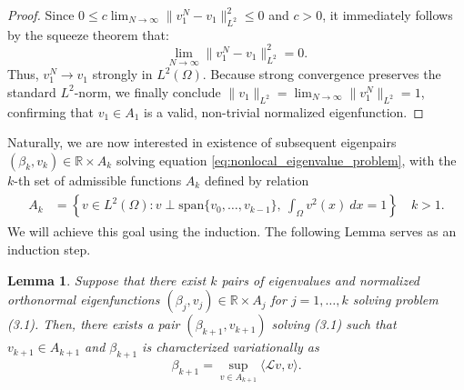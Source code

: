 \documentclass[11pt, a4paper]{article}
\theoremstyle{break}
\theoremstyle{break}
\theoremstyle{break}
\theoremstyle{break}
\theoremstyle{break}
\newtheorem{lem}{Lemma}[section]
\theoremstyle{break}
\theoremstyle{break}
\theoremstyle{break}
\theoremstyle{break}
\begin{document}
\begin{proof}
    Since $0 \leq c \lim_{N \to \infty} \|v_1^N - v_1\|_{L^2}^2 \leq 0$ and $c > 0$, it immediately follows by the squeeze theorem that:
    \begin{equation}
        \lim_{N \to \infty} \|v_1^N - v_1\|_{L^2}^2 = 0.
    \end{equation}
    Thus, $v_1^N \to v_1$ strongly in $L^2(\Omega)$. Because strong convergence preserves the standard $L^2$-norm, we finally conclude $\|v_1\|_{L^2} = \lim_{N \to \infty} \|v_1^N\|_{L^2} = 1$, confirming that $v_1 \in A_1$ is a valid, non-trivial normalized eigenfunction.
\end{proof}

Naturally, we are now interested in existence of subsequent eigenpairs $(\beta_k, v_k) \in \mathbb{R}\times A_k$ solving equation \eqref{eq:nonlocal_eigenvalue_problem}, with the $k$-th set of admissible functions $A_k$ defined by relation
\begin{align}
    \begin{split}
        A_k &= \left\{ v \in L^2(\Omega): v \perp \text{span}\{v_0, \ldots, v_{k-1}\}, \: \int_\Omega v^2(x) \: dx = 1 \right\} \quad k > 1.
    \end{split}
\end{align}
We will achieve this goal using the induction. The following Lemma serves as an induction step.

\begin{lem}
    \label{lem:inductive_step}
    Suppose that there exist $k$ pairs of eigenvalues and normalized orthonormal eigenfunctions $(\beta_j, v_j) \in \mathbb{R} \times A_j$ for $j=1, \ldots, k$ solving problem (3.1). Then, there exists a pair $(\beta_{k+1}, v_{k+1})$ solving (3.1) such that $v_{k+1} \in A_{k+1}$ and $\beta_{k+1}$ is characterized variationally as
    \begin{equation}
        \label{eq:eigenvalue_problem_k_plus_1}
        \beta_{k+1} = \sup_{v \in A_{k+1}} \langle \mathcal{L} v, v \rangle.
    \end{equation}
\end{lem}
\end{document}
